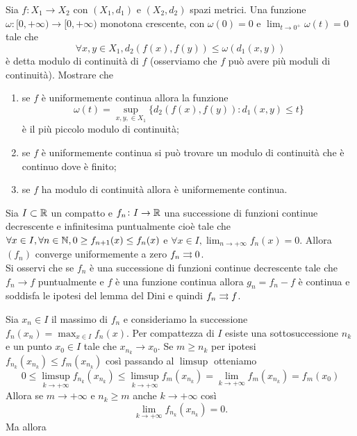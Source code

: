 \documentclass[a4paper]{article}\par \usepackage{style}\par
\begin{document}
\begin{es}
  Sia $ f \colon X_1 \to X_2 $ con $ (X_1, d_1) $ e $ (X_2, d_2) $ spazi metrici. Una funzione $ \omega \colon [0, +\infty) \to [0, +\infty) $ monotona crescente, con $ \omega(0) = 0 $ e $ \lim_{t \to 0^{+}} \omega(t) = 0 $ tale che \[\forall x, y \in X_1, d_2(f(x), f(y)) \leq \omega(d_1(x, y))\] è detta modulo di continuità di $ f $ (osserviamo che $ f $ può avere più moduli di continuità). Mostrare che
  \begin{enumerate}
  \item se $ f $ è uniformemente continua allora la funzione \[\omega(t) = \sup_{x, y, \in X_1} \{d_2(f(x), f(y)) : d_1(x, y) \leq t\}\] è il più piccolo modulo di continuità;
  \item se $ f $ è uniformemente continua si può trovare un modulo di continuità che è continuo dove è finito;
  \item se $ f $ ha modulo di continuità allora è uniformemente continua.
  \end{enumerate}
\end{es}\par \begin{es}
  Sia $ I \subset \mathbb{R} $ un compatto e $ f_n \colon I \to \mathbb{R} $ una successione di funzioni continue decrescente e infinitesima puntualmente cioè tale che $ \forall x \in I, \forall n \in \mathbb{N}, 0 \geq f_{n + 1}(x) \leq f_n(x) $ e $ \forall x \in I, \lim_{n \to +\infty} f_n(x) = 0 $. Allora $ (f_n) $ converge uniformemente a zero $ f_n \rightrightarrows 0 $. \\
  Si osservi che se $ f_n $ è una successione di funzioni continue decrescente tale che $ f_n \to f $ puntualmente e $ f $ è una funzione continua allora $ g_n = f_n - f $ è continua e soddisfa le ipotesi del lemma del Dini e quindi $ f_n \rightrightarrows f $.
\end{es}\par Sia $ x_n \in I $ il massimo di $ f_n $ e consideriamo la successione $ f_n(x_n) = \max_{x \in I} f_n(x) $. Per compattezza di $ I $ esiste una sottosuccessione $ n_k $ e un punto $ x_0 \in I $ tale che $ x_{n_k} \to x_0 $. Se $ m \geq n_k $ per ipotesi $ f_{n_k}(x_{n_k}) \leq f_m(x_{n_k}) $ così passando al $ \limsup $ otteniamo
\begin{equation*}
  0 \leq \limsup_{k \to +\infty} f_{n_k}(x_{n_k}) \leq \limsup_{k \to +\infty} f_{m}(x_{n_k}) = \lim_{k \to +\infty} f_m(x_{n_k}) = f_m(x_0)
\end{equation*}
Allora se $ m \to +\infty $ e $ n_k \geq m $ anche $ k \to +\infty $ così \[\lim_{k \to +\infty} f_{n_k}(x_{n_k}) = 0.\] Ma allora
\end{document}
